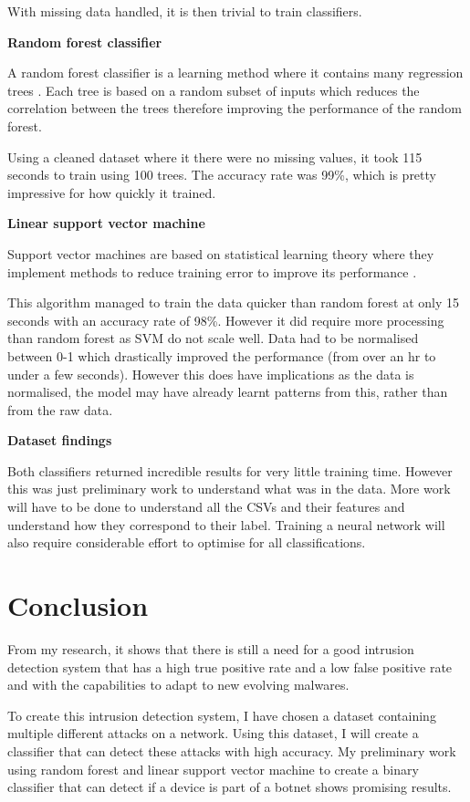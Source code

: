 \documentclass[11pt]{article}
\begin{document}
With missing data handled, it is then trivial to train classifiers.

\textbf{Random forest classifier}

A random forest classifier is a learning method where it contains many regression trees \cite{initial-analysis-rf}. Each tree is based on a random subset of inputs which reduces the correlation between the trees therefore improving the performance of the random forest. 

Using a cleaned dataset where it there were no missing values, it took 115 seconds to train using 100 trees. The accuracy rate was 99\%, which is pretty impressive for how quickly it trained. 

\textbf{Linear support vector machine}  

Support vector machines are based on statistical learning theory where they implement methods to reduce training error to improve its performance \cite{initial-analysis-svm}. 

This algorithm managed to train the data quicker than random forest at only 15 seconds with an accuracy rate of 98\%. However it did require more processing than random forest as SVM do not scale well. Data had to be normalised between 0-1 which drastically improved the performance (from over an hr to under a few seconds). However this does have implications as the data is normalised, the model may have already learnt patterns from this, rather than from the raw data. 

\textbf{Dataset findings}

Both classifiers returned incredible results for very little training time. However this was just preliminary work to understand what was in the data. More work will have to be done to understand all the CSVs and their features and understand how they correspond to their label. Training a neural network will also require considerable effort to optimise for all classifications. 

\section{Conclusion}
From my research, it shows that there is still a need for a good intrusion detection system that has a high true positive rate and a low false positive rate and with the capabilities to adapt to new evolving malwares. 

To create this intrusion detection system, I have chosen a dataset containing multiple different attacks on a network. Using this dataset, I will create a classifier that can detect these attacks with high accuracy. My preliminary work using random forest and linear support vector machine to create a binary classifier that can detect if a device is part of a botnet shows promising results. 
\end{document}
